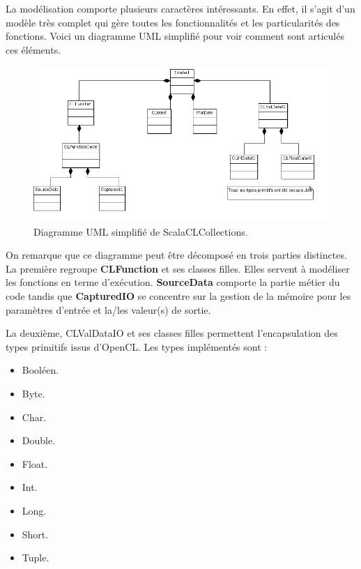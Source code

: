 \documentclass[a4paper,11pt]{report}
\begin{document}
{{\normalsize{
La modélisation comporte plusieurs caractères intéressants.  En effet, il s'agit d'un modèle très complet qui gère toutes les fonctionnalités et les particularités des fonctions. Voici un diagramme UML simplifié pour voir comment sont articulés ces éléments.
}

\begin{figure}[h]
   \begin{center}
   \includegraphics[scale = 0.60]{ClassScalaClcollection.png}
   \end{center}
  \caption{Diagramme UML simplifié de ScalaCLCollections.}
\end{figure}
\newpage
\normalsize{
On remarque que ce diagramme peut être décomposé en trois parties distinctes. La première regroupe {\bf CLFunction} et ses classes filles. Elles servent à modéliser les fonctions en terme d'exécution. {\bf SourceData} comporte la partie métier du code tandis que {\bf CapturedIO} se concentre sur la gestion de la mémoire pour les paramètres d'entrée et la/les valeur(s) de sortie.\\
}

\normalsize{
La deuxième, {CLValDataIO} et ses classes filles permettent l'encapsulation des types primitifs issus d'OpenCL. Les types implémentés sont :
}

\begin{itemize}
\item Booléen.
\item Byte.
\item Char.
\item Double.
\item Float.
\item Int.
\item Long.
\item Short.
\item Tuple. \\
\end{itemize}

}}
\end{document}
